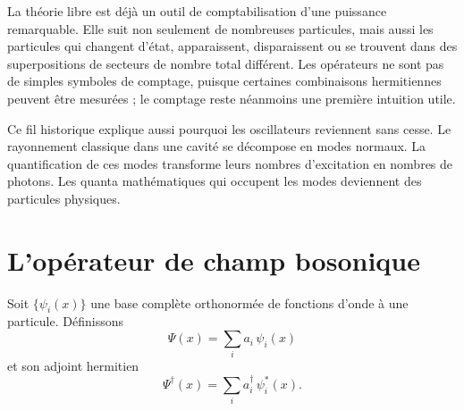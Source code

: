 La théorie libre est déjà un outil de comptabilisation d’une puissance remarquable. Elle suit non seulement de nombreuses particules, mais aussi les particules qui changent d’état, apparaissent, disparaissent ou se trouvent dans des superpositions de secteurs de nombre total différent. Les opérateurs ne sont pas de simples symboles de comptage, puisque certaines combinaisons hermitiennes peuvent être mesurées ; le comptage reste néanmoins une première intuition utile.

\begin{classroomqa}\end{classroomqa}

Ce fil historique explique aussi pourquoi les oscillateurs reviennent sans cesse. Le rayonnement classique dans une cavité se décompose en modes normaux. La quantification de ces modes transforme leurs nombres d’excitation en nombres de photons. Les quanta mathématiques qui occupent les modes deviennent des particules physiques.

\section{L’opérateur de champ bosonique}

Soit \(\{\psi_i(x)\}\) une base complète orthonormée de fonctions d’onde à une particule. Définissons
\begin{equation}
\boxed{\Psi(x)=\sum_i a_i\,\psi_i(x)}
\label{eq:l06-field-annihilation}
\end{equation}
et son adjoint hermitien
\begin{equation}
\boxed{\Psi^\dagger(x)=\sum_i a_i^\dagger\,\psi_i^*(x)}.
\label{eq:l06-field-creation}
\end{equation}

